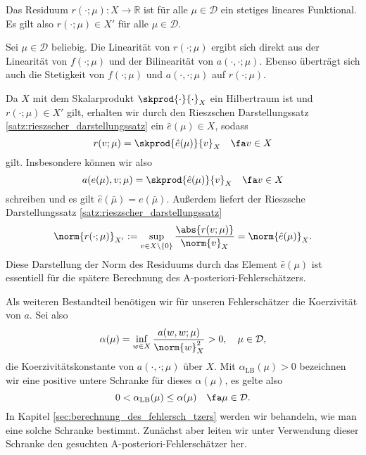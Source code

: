 \begin{Lemma}
    Das Residuum $r(\cdot; \mu) \colon X \to \mathbb{R}$ ist für alle $\mu \in \mathcal D$ ein stetiges lineares Funktional. Es gilt also $r(\cdot; \mu) \in X'$ für alle $\mu \in \mathcal D$.

    \begin{Beweis}
    Sei $\mu \in \mathcal D$ beliebig.
    Die Linearität von $r(\cdot; \mu)$ ergibt sich direkt aus der Linearität von $f(\cdot; \mu)$ und der Bilinearität von $a(\cdot, \cdot; \mu)$.
    Ebenso überträgt sich auch die Stetigkeit von $f(\cdot; \mu)$ und $a(\cdot, \cdot; \mu)$ auf $r(\cdot; \mu)$.
    \end{Beweis}
\end{Lemma}

Da $X$ mit dem Skalarprodukt $\skprod{\cdot}{\cdot}_X$ ein Hilbertraum ist und $r(\cdot; \mu) \in X'$ gilt, erhalten wir durch den Rieszschen Darstellungssatz \ref{satz:rieszscher_darstellungssatz} ein $\hat e(\mu) \in X$, sodass
\begin{equation}
    \label{eq:residuum_riesz}
    r(v; \mu) = \skprod{\hat e(\mu)}{v}_X \quad \fa v \in X
\end{equation}
gilt.
Insbesondere können wir also
\begin{equation}
    \label{eq:a_von_e_gl_skprod_e}
    a(e(\mu), v; \mu) = \skprod{\hat e(\mu)}{v}_X \quad \fa v \in X
\end{equation}
schreiben und es gilt $\hat e(\bar \mu) = e(\bar \mu)$.
Außerdem liefert der Rieszsche Darstellungssatz \ref{satz:rieszscher_darstellungssatz}
\begin{equation}
    \label{eq:residuum_norm_gl_hat_e_norm}
    \norm{r(\cdot; \mu)}_{X'} := \sup_{v \in X \setminus \left\{ 0 \right\}} \frac{\abs{r(v; \mu)}}{\norm{v}_X} = \norm{\hat e(\mu)}_X.
\end{equation}
Diese Darstellung der Norm des Residuums durch das Element $\hat e(\mu)$ ist essentiell für die spätere Berechnung des A-posteriori-Fehlerschätzers.

Als weiteren Bestandteil benötigen wir für unseren Fehlerschätzer die Koerzivität von $a$.
Sei also
\begin{equation}
            \alpha(\mu) = \inf_{w \in X} \frac{a(w, w; \mu)}{\norm{w}^2_X} > 0, \quad \mu \in \mathcal D,
\end{equation}
die Koerzivitätskonstante von $a(\cdot, \cdot; \mu)$ über $X$.
Mit $\alpha_{\text{LB}}(\mu) > 0$ bezeichnen wir eine positive untere Schranke für dieses $\alpha(\mu)$, es gelte also
\begin{equation}
    \label{eq:alpha_lb}
    0 < \alpha_{\text{LB}}(\mu) \leq \alpha(\mu) \quad \fa \mu \in \mathcal D.
\end{equation}
In Kapitel \ref{sec:berechnung_des_fehlersch_tzers} werden wir behandeln, wie man eine solche Schranke bestimmt.
Zunächst aber leiten wir unter Verwendung dieser Schranke den gesuchten A-posteriori-Fehlerschätzer her.

